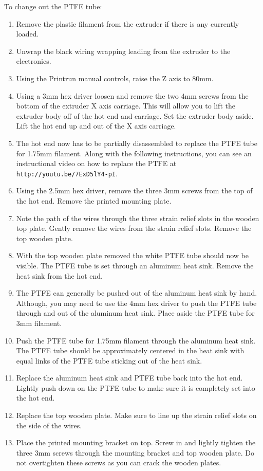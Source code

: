 To change out the PTFE tube:
\begin{enumerate}
\item Remove the plastic filament from the extruder if there is any currently loaded.
\item Unwrap the black wiring wrapping leading from the extruder to the electronics.
\item Using the Printrun manual controls, raise the Z axis to 80mm.
\item Using a 3mm hex driver loosen and remove the two 4mm screws from the bottom of the extruder X axis carriage. This will allow you to lift the extruder body off of the hot end and carriage. Set the extruder body aside. Lift the hot end up and out of the X axis carriage.
\item The hot end now has to be partially disassembled to replace the PTFE tube for 1.75mm filament. Along with the following instructions, you can see an instructional video on how to replace the PTFE at \texttt{http://youtu.be/7ExD5lY4-pI}. 
\item Using the 2.5mm hex driver, remove the three 3mm screws from the top of the hot end. Remove the printed mounting plate.
\item Note the path of the wires through the three strain relief slots in the wooden top plate. Gently remove the wires from the strain relief slots. Remove the top wooden plate.
\item With the top wooden plate removed the white PTFE tube should now be visible. The PTFE tube is set through an aluminum heat sink. Remove the heat sink from the hot end.
\item The PTFE can generally be pushed out of the aluminum heat sink by hand. Although, you may need to use the 4mm hex driver to push the PTFE tube through and out of the aluminum heat sink. Place aside the PTFE tube for 3mm filament.
\item Push the PTFE tube for 1.75mm filament through the aluminum heat sink. The PTFE tube should be approximately centered in the heat sink with equal links of the PTFE tube sticking out of the heat sink.
\item Replace the aluminum heat sink and PTFE tube back into the hot end. Lightly push down on the PTFE tube to make sure it is completely set into the hot end.
\item Replace the top wooden plate. Make sure to line up the strain relief slots on the side of the wires.
\item Place the printed mounting bracket on top. Screw in and lightly tighten the three 3mm screws through the mounting bracket and top wooden plate. Do not overtighten these screws as you can crack the wooden plates.

\end{enumerate}

